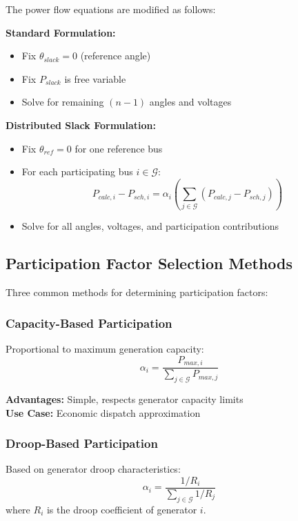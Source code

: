 \documentclass[11pt]{article}
\begin{document}
The power flow equations are modified as follows:

\textbf{Standard Formulation:}
\begin{itemize}
    \item Fix $\theta_{slack} = 0$ (reference angle)
    \item Fix $P_{slack}$ is free variable
    \item Solve for remaining $(n-1)$ angles and voltages
\end{itemize}

\textbf{Distributed Slack Formulation:}
\begin{itemize}
    \item Fix $\theta_{ref} = 0$ for one reference bus
    \item For each participating bus $i \in \mathcal{G}$:
    \begin{equation}
    P_{calc,i} - P_{sch,i} = \alpha_i \left( \sum_{j \in \mathcal{G}} (P_{calc,j} - P_{sch,j}) \right)
    \label{eq:dist_slack_constraint}
    \end{equation}
    \item Solve for all angles, voltages, and participation contributions
\end{itemize}

\subsection{Participation Factor Selection Methods}

Three common methods for determining participation factors:

\subsubsection{Capacity-Based Participation}
Proportional to maximum generation capacity:
\begin{equation}
\alpha_i = \frac{P_{max,i}}{\sum_{j \in \mathcal{G}} P_{max,j}}
\end{equation}

\textbf{Advantages:} Simple, respects generator capacity limits\\
\textbf{Use Case:} Economic dispatch approximation

\subsubsection{Droop-Based Participation}
Based on generator droop characteristics:
\begin{equation}
\alpha_i = \frac{1/R_i}{\sum_{j \in \mathcal{G}} 1/R_j}
\end{equation}
where $R_i$ is the droop coefficient of generator $i$.
\end{document}

